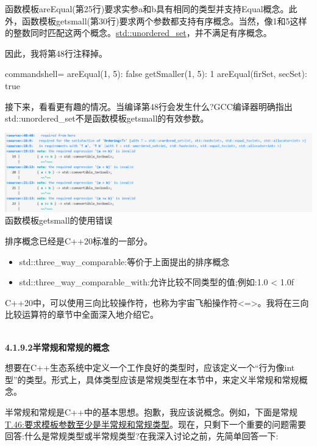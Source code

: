 函数模板areEqual(第25行)要求实参a和b具有相同的类型并支持Equal概念。此外，函数模板getsmall(第30行)要求两个参数都支持有序概念。当然，像1和5这样的整数同时匹配这两个概念。\href{https://en.cppreference.com/w/cpp/container/unordered_set}{std::unordered\_set}，并不满足有序概念。

因此，我将第48行注释掉。

\begin{tcblisting}{commandshell={}}
areEqual(1, 5): false
getSmaller(1, 5): 1
areEqual(firSet, secSet): true
\end{tcblisting}

接下来，看看更有趣的情况。当编译第48行会发生什么?GCC编译器明确指出std::unordered\_set不是函数模板getsmall的有效参数。

\begin{center}
\includegraphics[width=1.0\textwidth]{content/3/chapter4/images/1-5.png}\\
函数模板getsmall的使用错误
\end{center}

排序概念已经是C++20标准的一部分。

\begin{itemize}
\item 
std::three\_way\_comparable:等价于上面提出的排序概念

\item 
std::three\_way\_comparable\_with:允许比较不同类型的值;例如:1.0 < 1.0f
\end{itemize}

C++20中，可以使用三向比较操作符，也称为宇宙飞船操作符<=>。我将在三向比较运算符的章节中全面深入地介绍它。

\hspace*{\fill} \\ %
\noindent
\textbf{4.1.9.2\hspace{0.2cm}半常规和常规的概念}

想要在C++生态系统中定义一个工作良好的类型时，应该定义一个“行为像int型”的类型。形式上，具体类型应该是常规类型在本节中，来定义半常规和常规概念。

半常规和常规是C++中的基本思想。抱歉，我应该说概念。例如，下面是常规\href{http://isocpp.github.io/CppCoreGuidelines/CppCoreGuidelines#Rt-regular}{T.46:要求模板参数至少是半常规和常规类型}。现在，只剩下一个重要的问题需要回答:什么是常规类型或半常规类型?在我深入讨论之前，先简单回答一下:

